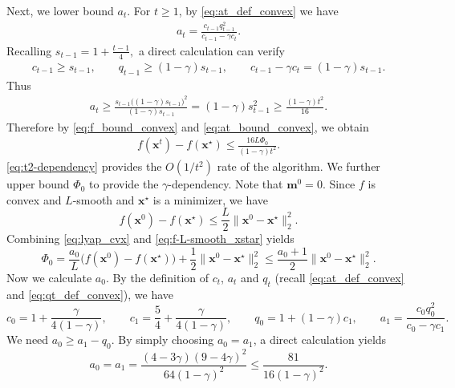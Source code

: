 \documentclass{article}
\theoremstyle{plain}
\theoremstyle{definition}
\theoremstyle{remark}
\begin{document}
Next, we lower bound \(a_t\). For \(t\ge 1\), by \eqref{eq:at_def_convex} we have
\begin{align}
a_t
=
\frac{c_{t-1}q_{t-1}^2}{c_{t-1}-\gamma c_t}.
\end{align}
Recalling $
s_{t-1}=1+\frac{t-1}{4},
$
a direct calculation can verify
\begin{align}
c_{t-1}\ge s_{t-1},
\qquad
q_{t-1}\ge (1-\gamma)s_{t-1},
\qquad
c_{t-1}-\gamma c_t=(1-\gamma)s_{t-1}.
\end{align}
Thus
\begin{align}\label{eq:at_bound_convex}
a_t
\ge
\frac{s_{t-1}\bigl((1-\gamma)s_{t-1}\bigr)^2}{(1-\gamma)s_{t-1}} 
=
(1-\gamma)s_{t-1}^2\ge \frac{(1-\gamma)t^2}{16}.
\end{align}
Therefore by \eqref{eq:f_bound_convex} and \eqref{eq:at_bound_convex}, we obtain
\begin{align}\label{eq:t2-dependency}
f(\mathbf{x}^{t})-f(\mathbf{x}^\star)
\le
\frac{16L\Phi_0}{(1-\gamma)t^2}.
\end{align}
\eqref{eq:t2-dependency} provides the $O(1/t^2)$ rate of the algorithm. We further upper bound $\Phi_0$ to provide the $\gamma$-dependency. Note that $\mathbf m^0=0$. Since $f$ is convex and $L$-smooth and
$\mathbf x^\star$ is a minimizer, we have
\begin{equation}\label{eq:f-L-smooth_xstar}
    f(\mathbf x^0)-f(\mathbf x^\star)
\le
\frac{L}{2}\|\mathbf x^0-\mathbf x^\star\|_2^2.
\end{equation}
Combining \eqref{eq:lyap_cvx} and \eqref{eq:f-L-smooth_xstar} yields
\begin{equation}\label{eq:phi_l2_bound}
    \Phi_0
=
\frac{a_0}{L}\bigl(f(\mathbf x^0)-f(\mathbf x^\star)\bigr)
+
\frac12\|\mathbf x^0-\mathbf x^\star\|_2^2
\le
\frac{a_0+1}{2}
\|\mathbf x^0-\mathbf x^\star\|_2^2.
\end{equation}
Now we calculate $a_0$. By the definition of $c_t$, $a_t$ and $q_t$ (recall \eqref{eq:at_def_convex} and \eqref{eq:qt_def_convex}), we have
\begin{equation}
    c_0=1+\frac{\gamma}{4(1-\gamma)}, \qquad c_1=\frac{5}{4}+\frac{\gamma}{4(1-\gamma)}, \qquad q_0=1+(1-\gamma)c_1, \qquad a_1=\frac{c_0q_0^2}{c_0-\gamma c_1}.
\end{equation}
We need $a_0\geq a_1-q_0$. By simply choosing $a_0=a_1$, a direct calculation yields
\begin{equation}\label{eq:a0_bound}
    a_0=a_1=\frac{(4-3\gamma)(9-4\gamma)^2}{64(1-\gamma)^2}\leq \frac{81}{16(1-\gamma)^2}.
\end{equation}
\end{document}

